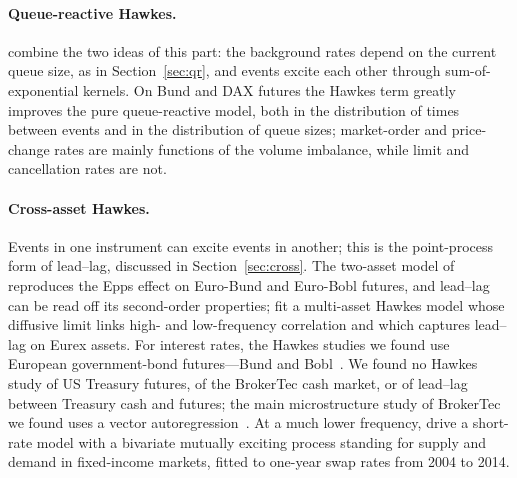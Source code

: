 \paragraph{Queue-reactive Hawkes.} \citet{wu2019qrhawkes} combine the two ideas of this part: the
background rates depend on the current queue size, as in Section~\ref{sec:qr}, and events excite each
other through sum-of-exponential kernels. On Bund and DAX futures the Hawkes term greatly improves the
pure queue-reactive model, both in the distribution of times between events and in the distribution of
queue sizes; market-order and price-change rates are mainly functions of the volume imbalance, while
limit and cancellation rates are not.

\paragraph{Cross-asset Hawkes.} Events in one instrument can excite events in another; this is the
point-process form of lead--lag, discussed in Section~\ref{sec:cross}. The two-asset model of
\citet{bacry2013} reproduces the Epps effect on Euro-Bund and Euro-Bobl futures, and lead--lag
can be read off its second-order properties; \citet{dafonseca2017} fit a multi-asset Hawkes model whose
diffusive limit links high- and low-frequency correlation and which captures lead--lag on Eurex
assets. For interest rates, the
Hawkes studies we found use European government-bond futures---Bund and Bobl~\citep{bacry2013,bacry2016,rambaldi2017marked}.
We found no Hawkes study of US Treasury futures, of the BrokerTec cash market, or of lead--lag between
Treasury cash and futures; the main microstructure study of BrokerTec we found uses a vector
autoregression~\citep{fleming2018brokertec}. At a much lower frequency, \citet{hainaut2016bivariate} drive a short-rate model with a bivariate
mutually exciting process standing for supply and demand in fixed-income markets, fitted to one-year swap rates
from 2004 to 2014.

